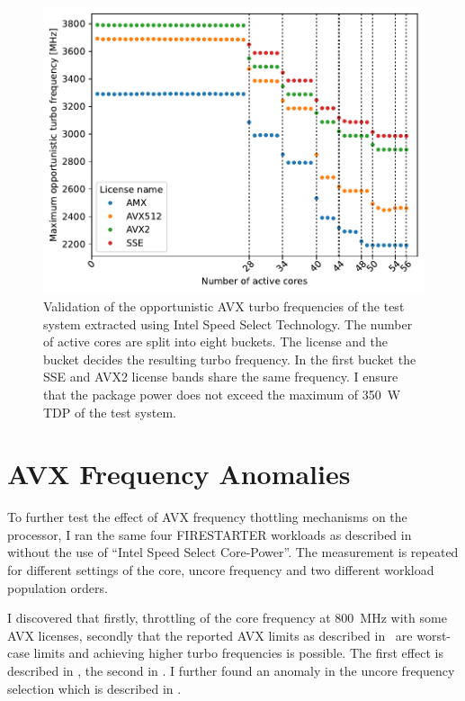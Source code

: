 \begin{figure}[]
    \centering
    \includegraphics[width=0.8\columnwidth]{fig/validate-avx-frequency-license-bands.pdf}
    \caption{\label{fig:validated-p0n-frequencies}Validation of the opportunistic AVX turbo frequencies of the test system extracted using Intel Speed Select Technology.
    The number of active cores are split into eight buckets. The license and the bucket decides the resulting turbo frequency.
    In the first bucket the SSE and AVX2 license bands share the same frequency. I ensure that the package power does not exceed the maximum of \SI{350}{\watt} TDP of the test system.}
\end{figure}


\section{AVX Frequency Anomalies}
\label{sec:avx-anomalies}

To further test the effect of AVX frequency thottling mechanisms on the processor, I ran the same four FIRESTARTER workloads as described in~ without the use of ``Intel Speed Select Core-Power''.
The measurement is repeated for different settings of the core, uncore frequency and two different workload population orders.

I discovered that firstly, throttling of the core frequency at \SI{800}{\MHz} with some AVX licenses, secondly that the reported AVX limits as described in~ are worst-case limits and achieving higher turbo frequencies is possible.
The first effect is described in , the second in .
I further found an anomaly in the uncore frequency selection which is described in .

